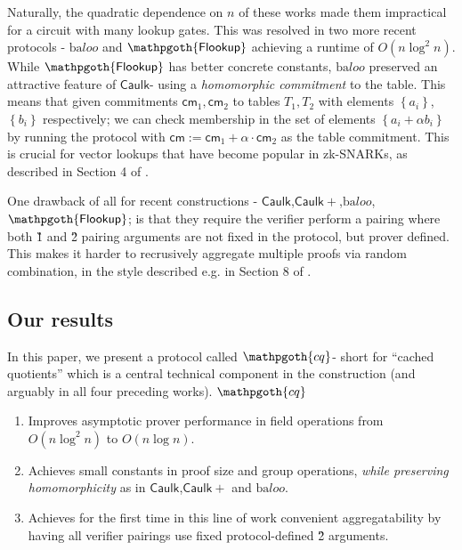 \documentclass[11pt]{article} %
\newcommand{\cq}{\ensuremath{\mathpgoth{cq} }\xspace}
\newcommand{\flookup}{\ensuremath{\mathsf{\mathpgoth{Flookup}}}\xspace}
\newcommand{\baloo}{\ensuremath{\mathrm{ba}\mathit{loo}}\xspace}
\newcommand{\caulkp}{\ensuremath{\mathsf{\mathrel{Caulk}\mathrel{\scriptstyle{+}}}}\xspace}
\newcommand{\caulk}{\ensuremath{\mathsf{Caulk}}\xspace}
\newcommand{\cm}{\ensuremath{\mathsf{cm}}\xspace}
\newcommand{\defeq}{:=}
\newcommand{\set}[1]{\ensuremath{\left\{#1\right\}}\xspace}
\newcommand{\witsize}{\ensuremath{n}\xspace}
\begin{document}
Naturally, the quadratic dependence on \witsize  of these works made them impractical for a circuit with many lookup gates. This was resolved in two more recent protocols - \baloo\cite{baloo} and \flookup\cite{flookup} achieving a runtime of $O(\witsize\log^2\witsize)$.
While \flookup has better concrete constants, \baloo preserved an attractive feature of \caulk\space  - using a \emph{homomorphic commitment} to the table. This means that given commitments $\cm_1,\cm_2$ to tables $T_1,T_2$ with elements \set{a_i},\set{b_i} respectively;
we can check membership in the set of elements $\set{a_i+\alpha b_i}$ by running the protocol with $\cm\defeq \cm_1+\alpha\cdot \cm_2$ as the table commitment. This is crucial for vector lookups that have become popular in zk-SNARKs, as described in Section 4 of \cite{plookup}.

One drawback of all for recent constructions - \caulk,\caulkp,\baloo,\flookup; is that they require the verifier perform a pairing where both \G1 and \G2 pairing arguments are not fixed in the protocol, but prover defined. This makes it harder to recrusively aggregate multiple proofs via random combination, in the style described e.g. in Section 8 of \cite{bcms}.

\subsection{Our results}

In this paper, we present a protocol called \cq\space  - short for ``cached quotients'' which is a central technical component in the construction (and arguably in all four preceding works). 
\cq
\begin{enumerate}
 \item Improves asymptotic prover performance in field operations from $O(\witsize\log^2\witsize)$ to $O(\witsize\log\witsize)$.
 \item Achieves small constants in proof size and group operations, \emph{while preserving homomorphicity} as in \caulk,\caulkp and \baloo.
 \item Achieves for the first time in this line of work convenient aggregatability by having all verifier pairings use fixed protocol-defined \G2 arguments.
\end{enumerate}
\end{document}

